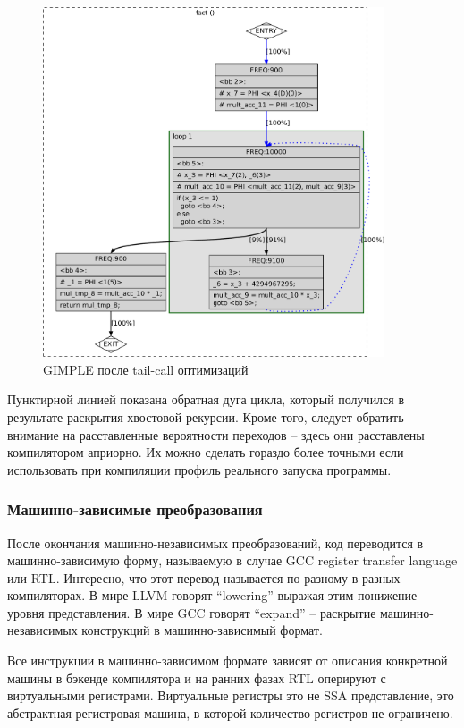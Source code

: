 \documentclass[a4paper,12pt,oneside]{article}
\begin{document}
\begin{figure}[ht]
\centering
\includegraphics[width=0.9\textwidth]{illustrations/fact-release_ssa-crop.pdf}
\caption{GIMPLE после tail-call оптимизаций}
\label{fig:fact_gimple_release_ssa}
\end{figure}

Пунктирной линией показана обратная дуга цикла, который получился в результате раскрытия хвостовой рекурсии. Кроме того, следует обратить внимание на расставленные вероятности переходов -- здесь они расставлены компилятором априорно. Их можно сделать гораздо более точными если использовать при компиляции профиль реального запуска программы.

\subsubsection{Машинно-зависимые преобразования}\label{subsubsec:MDTrans}

После окончания машинно-независимых преобразований, код переводится в машинно-зависимую форму, называемую в случае GCC register transfer language или RTL. Интересно, что этот перевод называется по разному в разных компиляторах. В мире LLVM говорят ``lowering'' выражая этим понижение уровня представления. В мире GCC говорят ``expand'' -- раскрытие машинно-независимых конструкций в машинно-зависимый формат.

Все инструкции в машинно-зависимом формате зависят от описания конкретной машины в бэкенде компилятора и на ранних фазах RTL оперируют с виртуальными регистрами. Виртуальные регистры это не SSA представление, это абстрактная регистровая машина, в которой количество регистров не ограничено.
\end{document}
